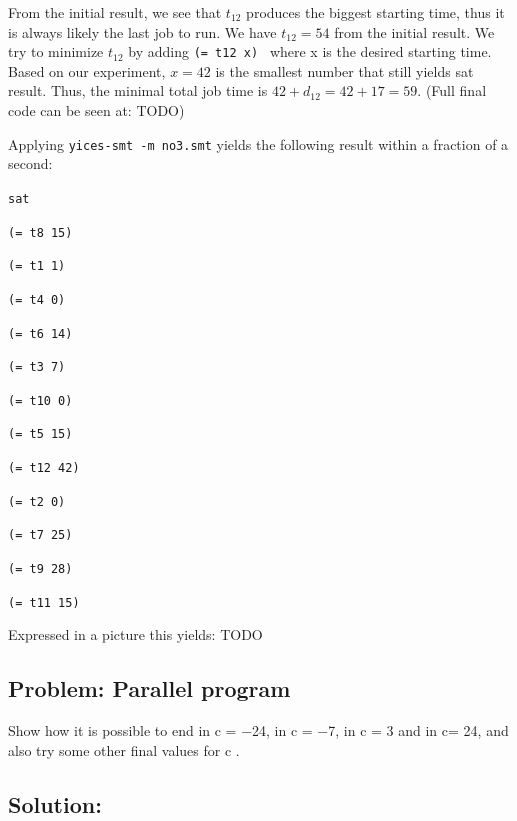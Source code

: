 \documentclass[12pt]{article}
\begin{document}
From the initial result, we see that $t_{12}$ produces the biggest starting time, thus it is always likely the last job to run. We have $t_{12}=54$ from the initial result. We try to minimize $t_{12}$ by adding {\tt (= t12 x) } where x is the desired starting time. Based on our experiment, $x=42$ is the smallest number that still yields sat result. Thus, the minimal total job time is $42+d_{12}=42+17=59$. (Full final code can be seen at: TODO)

Applying {\tt yices-smt -m no3.smt} yields the following result
within a fraction of a second: 

{\footnotesize
{\tt sat }

{\tt  }

{\tt (= t8 15) }

{\tt (= t1 1) }

{\tt (= t4 0) }

{\tt (= t6 14) }

{\tt (= t3 7) }

{\tt (= t10 0) }

{\tt (= t5 15) }

{\tt (= t12 42) }

{\tt (= t2 0) }

{\tt (= t7 25) }

{\tt (= t9 28) }

{\tt (= t11 15) }

{\tt  }
}
Expressed in a picture this yields: TODO

\pagebreak

\subsection*{Problem: Parallel program}
 Show how it is possible to end in c = −24, in c = −7, in c = 3 and in c= 24, and also try some other final values for c
 .

\subsection*{Solution:}
\end{document}
